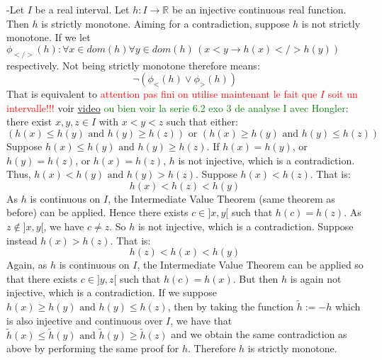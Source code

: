 \documentclass[11pt, a4paper, oneside]{article}
\theoremstyle{remark}
\theoremstyle{lemma}
\begin{document}
-Let \( I \) be a real interval. Let \( h: I \to \mathbb{R} \) be an injective continuous real function. Then \( h \) is strictly monotone.
Aiming for a contradiction, suppose \( h \) is not strictly monotone. If we let $\phi_{</>}(h):\forall x\in dom(h)\forall y\in dom(h)\,(x<y\rightarrow h(x)</>h(y))$ respectively. Not being strictly monotone therefore means:
$$\neg(\phi_{<}(h)\vee\phi_{>}(h))$$
That is equivalent to \textcolor{red}{attention pas fini on utilise maintenant le fait que $I$ soit un intervalle!!!}  voir \href{https://www.youtube.com/watch?v=dKuG4f3PT9s}{video} \textcolor{green}{ou bien voir la serie 6.2 exo 3 de analyse I avec Hongler}: there exist \( x, y, z \in I \) with \( x < y < z \) such that either:
\[
(h(x) \leq h(y) \text{ and } h(y) \geq h(z))\text{ or }
(h(x) \geq h(y) \text{ and } h(y) \leq h(z))
\]
Suppose \( h(x) \leq h(y) \text{ and } h(y) \geq h(z) \). If \( h(x) = h(y) \), or \( h(y) = h(z) \), or \( h(x) = h(z) \), \( h \) is not injective, which is a contradiction. Thus, \( h(x) < h(y) \text{ and } h(y) > h(z) \). Suppose \( h(x) < h(z) \). That is:
\[
h(x) < h(z) < h(y)
\]
As \( h \) is continuous on \( I \), the Intermediate Value Theorem (same theorem as before) can be applied. Hence there exists \( c \in ]x, y[ \) such that \( h(c) = h(z) \). As \( z \notin ]x, y[ \), we have \( c \neq z \). So \( h \) is not injective, which is a contradiction. Suppose instead \( h(x) > h(z) \). That is:
\[
h(z) < h(x) < h(y)
\]
Again, as \( h \) is continuous on \( I \), the Intermediate Value Theorem can be applied so that there exists \( c \in ]y, z[ \) such that \( h(c) = h(x) \). But then \( h \) is again not injective, which is a contradiction.
If we suppose \( h(x) \geq h(y) \text{ and } h(y) \leq h(z) \), then by taking the function $\tilde{h}:=-h$ which is also injective and continuous over $I$, we have that $\tilde{h}(x)\leq \tilde{h}(y)\text{ and } \tilde{h}(y)\geq \tilde{h}(z)$ and we obtain the same contradiction as above by performing the same proof for $h$.
Therefore $h$ is strictly monotone.
\\\\
\end{document}
